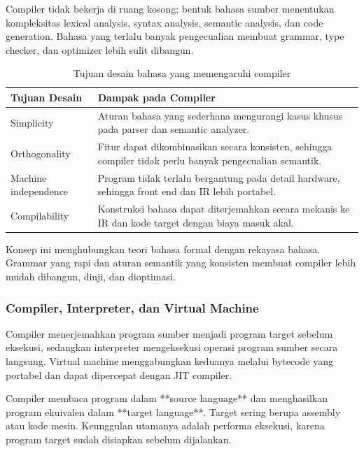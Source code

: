 Compiler tidak bekerja di ruang kosong; bentuk bahasa sumber menentukan kompleksitas lexical analysis, syntax analysis, semantic analysis, dan code generation. Bahasa yang terlalu banyak pengecualian membuat grammar, type checker, dan optimizer lebih sulit dibangun.

\begin{table}[H]
\centering
\begin{tabularx}{\textwidth}{|L{0.24\textwidth}|X|}
\hline
\textbf{Tujuan Desain} & \textbf{Dampak pada Compiler} \\
\hline
Simplicity & Aturan bahasa yang sederhana mengurangi kasus khusus pada parser dan semantic analyzer. \\
\hline
Orthogonality & Fitur dapat dikombinasikan secara konsisten, sehingga compiler tidak perlu banyak pengecualian semantik. \\
\hline
Machine independence & Program tidak terlalu bergantung pada detail hardware, sehingga front end dan IR lebih portabel. \\
\hline
Compilability & Konstruksi bahasa dapat diterjemahkan secara mekanis ke IR dan kode target dengan biaya masuk akal. \\
\hline
\end{tabularx}
\caption{Tujuan desain bahasa yang memengaruhi compiler}
\label{tab:tujuan-desain-bahasa}
\end{table}

Konsep ini menghubungkan teori bahasa formal dengan rekayasa bahasa. Grammar yang rapi dan aturan semantik yang konsisten membuat compiler lebih mudah dibangun, diuji, dan dioptimasi.

\subsubsection{Compiler, Interpreter, dan Virtual Machine}

\begin{jawab}
Compiler menerjemahkan program sumber menjadi program target sebelum eksekusi, sedangkan interpreter mengeksekusi operasi program sumber secara langsung. Virtual machine menggabungkan keduanya melalui bytecode yang portabel dan dapat dipercepat dengan JIT compiler.
\end{jawab}

Compiler membaca program dalam **source language** dan menghasilkan program ekuivalen dalam **target language**. Target sering berupa assembly atau kode mesin. Keunggulan utamanya adalah performa eksekusi, karena program target sudah disiapkan sebelum dijalankan.

